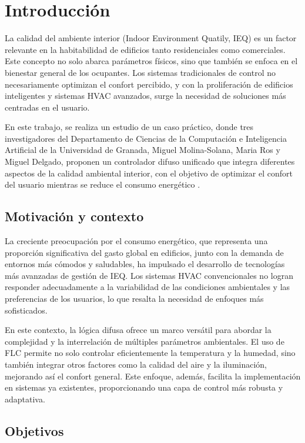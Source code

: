 \section{Introducción}

La calidad del ambiente interior (Indoor Environment Quatily, IEQ) es un factor relevante en la habitabilidad de edificios tanto residenciales como comerciales. Este concepto no solo abarca parámetros físicos, sino que también se enfoca en el bienestar general de los ocupantes. Los sistemas tradicionales de control no necesariamente optimizan el confort percibido, y con la proliferación de edificios inteligentes y sistemas HVAC avanzados, surge la necesidad de soluciones más centradas en el usuario.

En este trabajo, se realiza un estudio de un caso práctico, donde tres investigadores del Departamento de Ciencias de la Computación e Inteligencia Artificial de la Universidad de Granada, Miguel Molina-Solana, Maria Ros y Miguel Delgado, proponen un controlador difuso unificado que integra diferentes aspectos de la calidad ambiental interior, con el objetivo de optimizar el confort del usuario mientras se reduce el consumo energético \parencite{molina2013unifying}.

\subsection{Motivación y contexto}

La creciente preocupación por el consumo energético, que representa una proporción significativa del gasto global en edificios, junto con la demanda de entornos más cómodos y saludables, ha impulsado el desarrollo de tecnologías más avanzadas de gestión de IEQ. Los sistemas HVAC convencionales no logran responder adecuadamente a la variabilidad de las condiciones ambientales y las preferencias de los usuarios, lo que resalta la necesidad de enfoques más sofisticados.

En este contexto, la lógica difusa ofrece un marco versátil para abordar la complejidad y la interrelación de múltiples parámetros ambientales. El uso de FLC permite no solo controlar eficientemente la temperatura y la humedad, sino también integrar otros factores como la calidad del aire y la iluminación, mejorando así el confort general. Este enfoque, además, facilita la implementación en sistemas ya existentes, proporcionando una capa de control más robusta y adaptativa.


\subsection{Objetivos}

